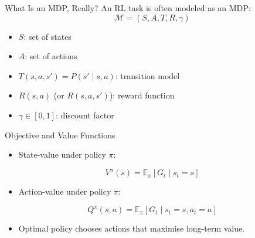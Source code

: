 \documentclass[aspectratio=169]{beamer}
\newcommand{\defaultdeckrefs}{AIMA4e Ch.22 pp.789--822; Poole3e Ch.13 pp.583--608}
\newcommand{\currentsliderefs}{\defaultdeckrefs}
\newcommand{\setslideref}[1]{\gdef\currentsliderefs{#1}}
\begin{document}
\setslideref{AIMA4e Ch.22 pp.789--822; Poole3e Ch.13 pp.583--608}
\begin{frame}{What Is an MDP, Really?}
An RL task is often modeled as an MDP:
\[
\mathcal{M}=(S, A, T, R, \gamma)
\]
\begin{itemize}
  \item $S$: set of states
  \item $A$: set of actions
  \item $T(s,a,s') = P(s'\mid s,a)$: transition model
  \item $R(s,a)$ (or $R(s,a,s')$): reward function
  \item $\gamma \in [0,1]$: discount factor
\end{itemize}
\vspace{0.3em}
\end{frame}

\setslideref{AIMA4e Ch.22 pp.789--822; Poole3e Ch.13 pp.583--608}
\begin{frame}{Objective and Value Functions}
\begin{itemize}
  \item State-value under policy $\pi$:
\end{itemize}
\[
V^{\pi}(s)=\mathbb{E}_{\pi}[G_t\mid s_t=s]
\]
\begin{itemize}
  \item Action-value under policy $\pi$:
\end{itemize}
\[
Q^{\pi}(s,a)=\mathbb{E}_{\pi}[G_t\mid s_t=s, a_t=a]
\]
\begin{itemize}
  \item Optimal policy chooses actions that maximise long-term value.
\end{itemize}
\end{frame}
\end{document}
